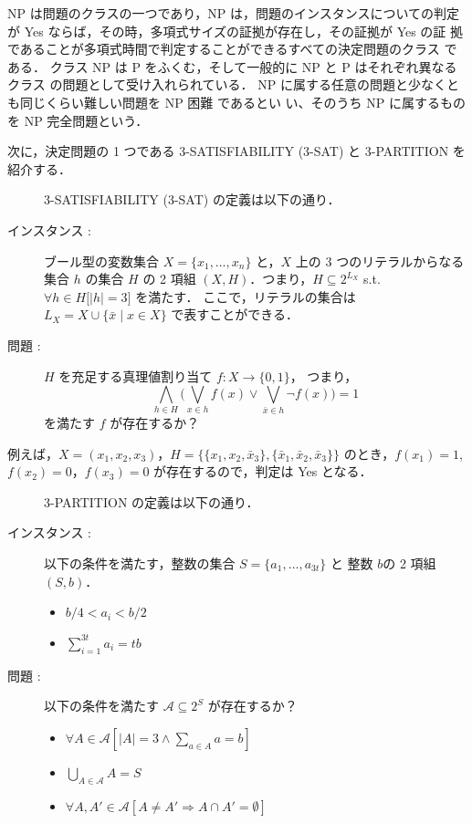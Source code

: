 \documentclass[12pt]{optlab-bachelor}
\begin{document}
NP は問題のクラスの一つであり，NP は，問題のインスタンスについての判定
が Yes ならば，その時，多項式サイズの証拠が存在し，その証拠が Yes の証
拠であることが多項式時間で判定することができるすべての決定問題のクラス
である．
クラス NP は P をふくむ，そして一般的に NP と P はそれぞれ異なるクラス
の問題として受け入れられている．
NP に属する任意の問題と少なくとも同じくらい難しい問題を NP 困難 であるとい
い、そのうち NP に属するものを NP 完全問題という．

次に，決定問題の 1 つである \textsc{\textsc{3-SATISFIABILITY}} (\textsc{3-SAT}) と \textsc{3-PARTITION} を紹介する．

\begin{description}
  \item[] \textsc{\textsc{3-SATISFIABILITY}} (\textsc{3-SAT}) の定義は以下の通り．
  \item[インスタンス : ] ブール型の変数集合 $X = \{x_1,\ldots,x_n\}$ と，$X$ 上の 3 つのリテラルからなる集合 $h$ の集合 $H$ の 2 項組 $(X,H)$．つまり，$H \subseteq 2^{L_X}$ s.t. $\forall h \in H \big[|h| = 3\big]$ を満たす．
  ここで，リテラルの集合は $L_X = X \cup \{\bar x \mid x \in X\}$ で表すことができる．
  \item[問題 : ] $H$ を充足する真理値割り当て $f : X \to \{0,1\}$，
  つまり，
  $$\displaystyle \bigwedge_{h \in H} \bigg(\bigvee_{x \in h}f(x) \lor
  \bigvee_{\bar x \in h}\lnot f(x) \bigg) = 1$$
  を満たす $f$ が存在するか？
\end{description}

例えば，$X = (x_1, x_2, x_3)$，$H = \{\{x_1, x_2, \bar x_3\}, \{\bar x_1, \bar x_2, \bar x_3\}\}$ のとき，$f(x_1) = 1$, $f(x_2) = 0$，$f(x_3) = 0$ が存在するので，判定は Yes となる．

\begin{description}
  \item[] \textsc{3-PARTITION} の定義は以下の通り．
  \item[インスタンス : ] 以下の条件を満たす，整数の集合 $S = \{a_1,\ldots,a_{3t}\}$ と 整数 $b$の 2 項組 $(S,b)$．
  \begin{itemize}
    \item $b/4 < a_i < b/2$
    \item $\displaystyle \sum_{i = 1}^{3t}a_i = tb$
  \end{itemize}
  \item[問題 : ] 以下の条件を満たす $\mathcal{A} \subseteq 2^S$ が存在するか？
  \begin{itemize}
    \item $\forall A \in \mathcal{A}[|A| = 3 \land \sum_{a \in A} a = b]$
    \item $\bigcup_{A \in \mathcal{A}} A = S$
    \item $\forall A, A' \in \mathcal{A}[A \neq A' \Rightarrow A \cap A' = \emptyset]$
  \end{itemize}
\end{description}
\end{document}
